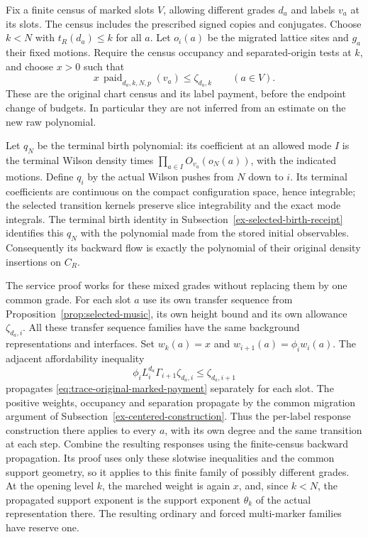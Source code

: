 Fix a finite census of marked slots $V$, allowing different grades
$d_a$ and labels $v_a$ at its slots. The census includes the prescribed
signed copies and conjugates. Choose $k<N$ with $t_R(d_a)\le k$ for
all $a$. Let $o_i(a)$ be the migrated lattice sites and $g_a$ their fixed
motions. Require the census occupancy and separated-origin tests at
$k$, and choose $x>0$ such that
\begin{equation}\label{eq:trace-original-marked-payment}
 x\,\operatorname{paid}_{d_a,k,N,p}(v_a)
                   \le\zeta_{d_a,k}\qquad(a\in V).
\end{equation}
These are the original chart census and its label payment, before the
endpoint change of budgets. In particular they are not inferred from
an estimate on the new raw polynomial.

Let $q_N$ be the terminal birth polynomial: its coefficient at an
allowed mode $I$ is the terminal Wilson density times
$\prod_{a\in I}O_{v_a}(o_N(a))$, with the indicated motions. Define
$q_i$ by the actual Wilson pushes from $N$ down to $i$. Its terminal
coefficients are continuous on the compact configuration space,
hence integrable; the selected transition kernels preserve slice
integrability and the exact mode integrals. The terminal birth
identity in Subsection~\ref{ex-selected-birth-receipt} identifies this
$q_N$ with the polynomial made from the stored initial observables.
Consequently its backward flow is exactly the polynomial of their
original density insertions on $C_R$.

The service proof works for these mixed grades without replacing them
by one common grade. For each slot $a$ use its own transfer sequence from
Proposition~\ref{prop:selected-music}, its own height bound and its
own allowance $\zeta_{d_a,i}$. All these transfer sequence families have the same
background representations and interfaces. Set $w_k(a)=x$ and
$w_{i+1}(a)=\phi_iw_i(a)$. The adjacent affordability inequality
\[
 \phi_iL_i^{d_a}\Gamma_{i+1}\zeta_{d_a,i}
                 \le\zeta_{d_a,i+1}
\]
propagates \eqref{eq:trace-original-marked-payment} separately for
each slot. The positive weights, occupancy and separation propagate
by the common migration argument of
Subsection~\ref{ex-centered-construction}. Thus the per-label response
construction there applies to every $a$, with its own degree and the
same transition at each step. Combine the resulting responses using
the finite-census backward propagation. Its proof uses only these
slotwise inequalities and the common support geometry, so it applies
to this finite family of possibly different grades. At the opening
level $k$, the marched weight is again $x$, and, since $k<N$, the
propagated support exponent is the support exponent $\theta_k$ of
the actual representation there. The resulting ordinary and forced
multi-marker families have reserve one.

